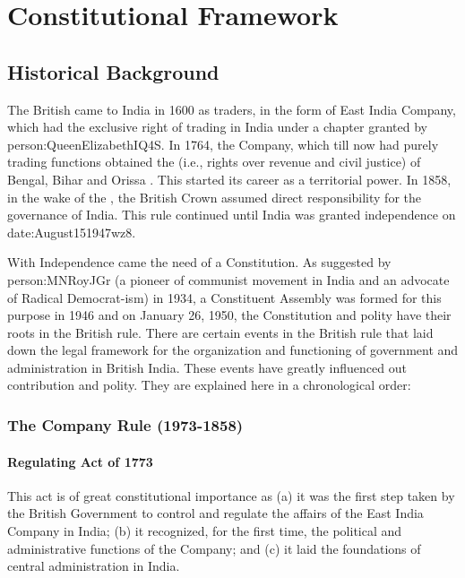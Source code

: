 \thispagestyle{empty}
\part{Constitutional Framework}
\restoregeometry
\cleardoublepage

\twocolumn

\chapter{Historical Background}

The British came to India in 1600 as traders, in the form of East India Company, which had the exclusive right of trading in India under a chapter granted by \gls{person:QueenElizabethIQ4S}. In 1764, the Company, which till now had purely trading functions obtained the \hspace{4pt}(i.e., rights over revenue and civil justice) of Bengal, Bihar and Orissa
. This started its career as a territorial power. In 1858, in the wake of the , the British Crown assumed direct responsibility for the governance of India. This rule continued until India was granted independence on \gls{date:August151947wz8}.

With Independence came the need of a Constitution. As suggested by \gls{person:MNRoyJGr} (a pioneer of communist movement in India and an advocate of Radical Democrat-ism) in 1934, a Constituent Assembly was formed for this purpose in 1946 and on January 26, 1950, the Constitution and polity have their roots in the British rule. There are certain events in the British rule that laid down the legal framework for the organization and functioning of government and administration in British India. These events have greatly influenced out contribution and polity. They are explained here in a chronological order:

\section{The Company Rule (1973-1858)}

\subsection{Regulating Act of 1773}
This act is of great constitutional importance as (a) it was the first step taken by the British Government to control and regulate the affairs of the East India Company in India; (b) it recognized, for the first time, the political and administrative functions of the Company; and (c) it laid the foundations of central administration in India.

